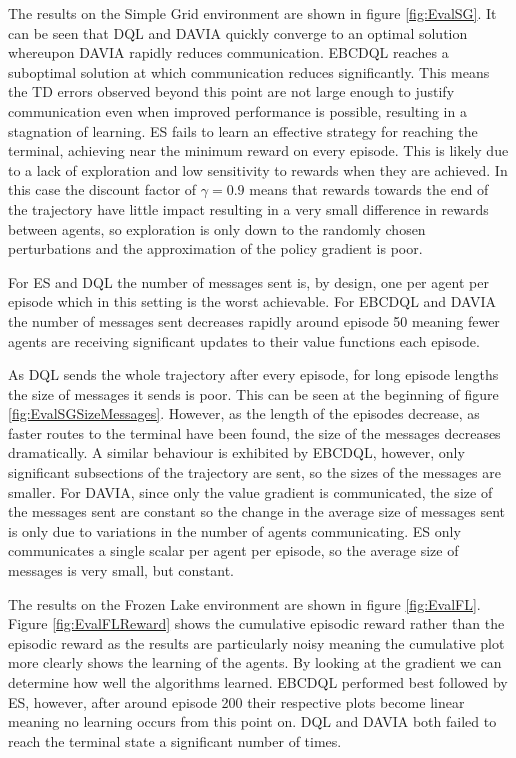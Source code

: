 The results on the Simple Grid environment are shown in figure \ref{fig:EvalSG}. It can be seen that DQL and DAVIA quickly converge to an optimal solution whereupon DAVIA rapidly reduces communication. EBCDQL reaches a suboptimal solution at which communication reduces significantly. This means the TD errors observed beyond this point are not large enough to justify communication even when improved performance is possible, resulting in a stagnation of learning. ES fails to learn an effective strategy for reaching the terminal, achieving near the minimum reward on every episode. This is likely due to a lack of exploration and low sensitivity to rewards when they are achieved. In this case the discount factor of $\gamma=0.9$ means that rewards towards the end of the trajectory have little impact resulting in a very small difference in rewards between agents, so exploration is only down to the randomly chosen perturbations and the approximation of the policy gradient is poor.

For ES and DQL the number of messages sent is, by design, one per agent per episode which in this setting is the worst achievable. For EBCDQL and DAVIA the number of messages sent decreases rapidly around episode 50 meaning fewer agents are receiving significant updates to their value functions each episode.

As DQL sends the whole trajectory after every episode, for long episode lengths the size of messages it sends is poor. This can be seen at the beginning of figure \ref{fig:EvalSGSizeMessages}. However, as the length of the episodes decrease, as faster routes to the terminal have been found, the size of the messages decreases dramatically. A similar behaviour is exhibited by EBCDQL, however, only significant subsections of the trajectory are sent, so the sizes of the messages are smaller. For DAVIA, since only the value gradient is communicated, the size of the messages sent are constant so the change in the average size of messages sent is only due to variations in the number of agents communicating. ES only communicates a single scalar per agent per episode, so the average size of messages is very small, but constant.

The results on the Frozen Lake environment are shown in figure \ref{fig:EvalFL}. Figure \ref{fig:EvalFLReward} shows the cumulative episodic reward rather than the episodic reward as the results are particularly noisy meaning the cumulative plot more clearly shows the learning of the agents. By looking at the gradient we can determine how well the algorithms learned. EBCDQL performed best followed by ES, however, after around episode 200 their respective plots become linear meaning no learning occurs from this point on. DQL and DAVIA both failed to reach the terminal state a significant number of times.

